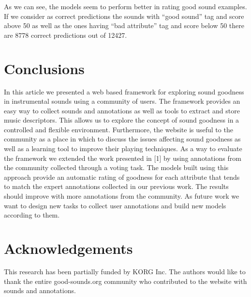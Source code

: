 \documentclass{article}
\begin{document}
As we can see, the models seem to perform better in rating good sound examples. If we consider as correct predictions the sounds with “good sound” tag and score above 50 as well as the ones having “bad attribute” tag and score below 50 there are 8778 correct predictions out of 12427. 

\section{Conclusions}
In this article we presented a web based framework for exploring sound goodness in instrumental sounds using a community of users. The framework provides an easy way to collect sounds and annotations as well as tools to extract and store music descriptors. This allows us to explore the concept of sound goodness in a controlled and flexible environment. Furthermore, the website is useful to the community as a place in which to discuss the issues affecting sound goodness as well as a learning tool to improve their playing techniques. 
As a way to evaluate the framework we extended the work presented in [1] by using annotations from the community collected through a voting task. The models built using this approach provide an automatic rating of goodness for each attribute that tends to match the expert annotations collected in our previous work. The results should improve with more annotations from the community.
As future work we want to design new tasks to collect user annotations and build new models according to them. 

\section{Acknowledgements}
This research has been partially funded by KORG Inc. The authors would like to thank the entire good-sounds.org community who contributed to the website with sounds and annotations.

%
\end{document}
